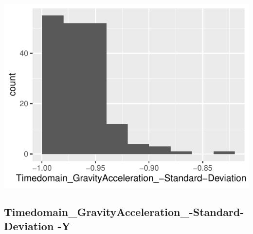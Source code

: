 \documentclass[
]{article}
\begin{document}
\begin{minipage}{0.25 \textwidth}

\includegraphics{codebook_tidydatasub_files/figure-latex/Var-12-Timedomain-GravityAcceleration--Standard-Deviation--X-1.pdf}

\end{minipage}

\noindent\makebox[\linewidth]{\rule{\textwidth}{0.4pt}}

\hypertarget{timedomain_gravityacceleration_-standard-deviation--y}{%
\subsection{Timedomain\_GravityAcceleration\_-Standard-Deviation
-Y}\label{timedomain_gravityacceleration_-standard-deviation--y}}
\end{document}
